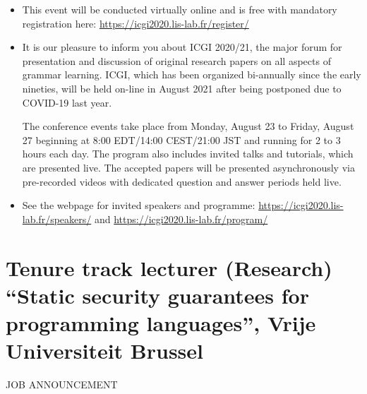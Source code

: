 \documentclass[prodmode,acmtecs]{acmsmall} %
\begin{document}
\begin{itemize}\item  This event will be conducted virtually online and is free with mandatory registration here: \href{https://icgi2020.lis-lab.fr/register/}{https://icgi2020.lis-lab.fr/register/}   
 
\item  It is our pleasure to inform you about ICGI 2020/21, the major forum for presentation and discussion of original research papers on all aspects of grammar learning. ICGI, which has been organized bi-annually since the early nineties, will be held on-line in August 2021 after being postponed due to COVID-19 last year. 
 
   The conference events take place from Monday, August 23 to Friday, August 27 beginning at 8:00 EDT/14:00 CEST/21:00 JST and running for 2 to 3 hours each day. The program also includes invited talks and tutorials, which are presented live. The accepted papers will be presented asynchronously via pre-recorded videos with dedicated question and answer periods held live. 
 
\item  See the webpage for invited speakers and programme: \href{https://icgi2020.lis-lab.fr/speakers/}{https://icgi2020.lis-lab.fr/speakers/} and \href{https://icgi2020.lis-lab.fr/program/}{https://icgi2020.lis-lab.fr/program/} 
 
\end{itemize}\section{Tenure track lecturer (Research) “Static security guarantees for programming languages”, Vrije Universiteit Brussel}\label{TenuretracklecturerResearchStaticsecurityguaranteesforprogramminglanguagesVrijeUniversiteitBrussel}JOB ANNOUNCEMENT 
\end{document}
